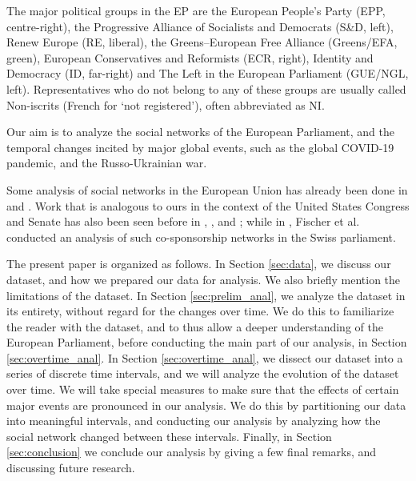 \documentclass[lettersize,journal]{IEEEtran}
\begin{document}
The major political groups in the EP are the European People's Party (EPP, centre-right), the Progressive Alliance of Socialists and Democrats (S\&D, left), Renew Europe (RE, liberal), the Greens–European Free Alliance (Greens/EFA, green), European Conservatives and Reformists (ECR, right), Identity and Democracy (ID, far-right) and The Left in the European Parliament (GUE/NGL, left). Representatives who do not belong to any of these groups are usually called Non-iscrits (French for `not registered'), often abbreviated as NI.

Our aim is to analyze the social networks of the European Parliament, and the temporal changes incited by major global events, such as the global COVID-19 pandemic, and the Russo-Ukrainian war.

Some analysis of social networks in the European Union has already been done in \cite{Baller} and \cite{Cherepnalkoski}. Work that is analogous to ours in the context of the United States Congress and Senate has also been seen before in \cite{Desmarais}, \cite{Fowler}, \cite{Porter} and \cite{Tanger}; while in \cite{Fischer}, Fischer et al. conducted an analysis of such co-sponsorship networks in the Swiss parliament.


The present paper is organized as follows. In Section \ref{sec:data}, we discuss our dataset, and how we prepared our data for analysis. We also briefly mention the limitations of the dataset. In Section \ref{sec:prelim_anal}, we analyze the dataset in its entirety, without regard for the changes over time. We do this to familiarize the reader with the dataset, and to thus allow a deeper understanding of the European Parliament, before conducting the main part of our analysis, in Section \ref{sec:overtime_anal}. In Section \ref{sec:overtime_anal}, we dissect our dataset into a series of discrete time intervals, and we will analyze the evolution of the dataset over time. We will take special measures to make sure that the effects of certain major events are pronounced in our analysis. We do this by partitioning our data into meaningful intervals, and conducting our analysis by analyzing how the social network changed between these intervals. Finally, in Section \ref{sec:conclusion} we conclude our analysis by giving a few final remarks, and discussing future research.
\end{document}

